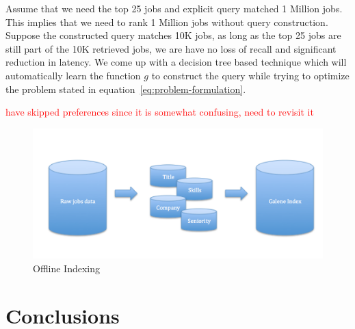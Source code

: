 \documentclass{sig-alternate-05-2015}
\newcommand\TODO[1]{\textcolor{red}{#1}}
\begin{document}
Assume that we need the top 25 jobs and explicit query matched 1 Million jobs.
This implies that we need to rank 1 Million jobs without query construction.
Suppose the constructed query matches 10K jobs, as long as the top 25 jobs are
still part of the 10K retrieved jobs, we are have no loss of recall and
significant reduction in latency.
We come up with a decision tree based technique which will automatically learn
the function $g$ to construct the query while trying to optimize the problem
stated in equation~\ref{eq:problem-formulation}.

\TODO{have skipped preferences since it is somewhat confusing, need to
revisit it}



\begin{figure}
\includegraphics[width=\linewidth,height=\textheight,keepaspectratio]{offline-indexing.png}
\caption{Offline Indexing}
\label{fig:offline-indexing}
\end{figure}









\section{Conclusions}
\end{document}
